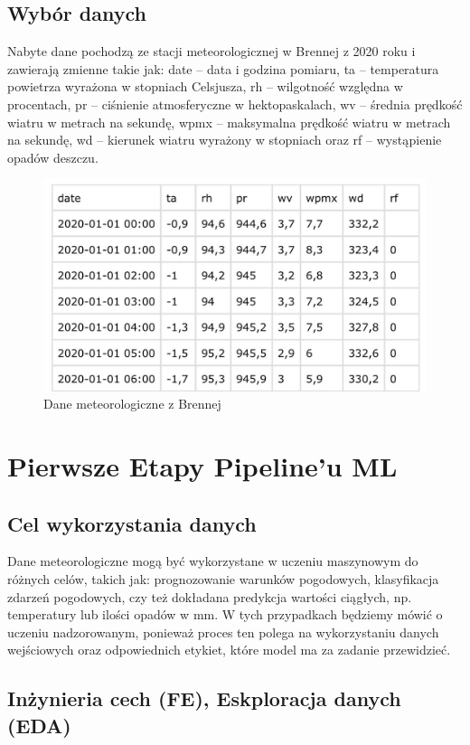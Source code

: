 \documentclass[10pt,a4paper]{article}
\begin{document}
\subsection*{Wybór danych}
Nabyte dane pochodzą ze stacji meteorologicznej w Brennej z 2020 roku i zawierają zmienne takie jak: date – data i godzina pomiaru, ta – temperatura powietrza wyrażona w stopniach Celsjusza, rh – wilgotność względna w procentach, pr – ciśnienie atmosferyczne w hektopaskalach, wv – średnia prędkość wiatru w metrach na sekundę, wpmx – maksymalna prędkość wiatru w metrach na sekundę, wd – kierunek wiatru wyrażony w stopniach oraz rf – wystąpienie opadów deszczu.
\begin{figure}[h]
	\centering
	\includegraphics[scale=0.4]{Image.jpg}
	\caption{Dane meteorologiczne z Brennej}
	\label{fig:my_label}
\end{figure}

\section{Pierwsze Etapy Pipeline'u ML}
\subsection*{Cel wykorzystania danych}
Dane meteorologiczne mogą być wykorzystane w uczeniu maszynowym do różnych celów, takich jak: prognozowanie warunków pogodowych, klasyfikacja zdarzeń pogodowych, czy też dokładana predykcja wartości ciągłych, np. temperatury lub ilości opadów w mm. W tych przypadkach będziemy mówić o uczeniu nadzorowanym, ponieważ proces ten polega na wykorzystaniu danych wejściowych oraz odpowiednich etykiet, które model ma za zadanie przewidzieć.
\subsection{Inżynieria cech (FE), Eskploracja danych (EDA)}
\end{document}
